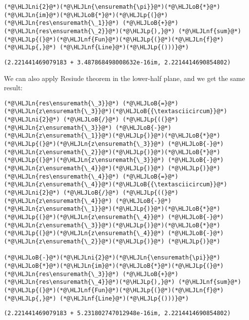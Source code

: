 \documentclass[12pt,landscape]{article}
\newcommand{\HLJLn}[1]{#1}
\newcommand{\HLJLnf}[1]{\textcolor[RGB]{66,102,213}{#1}}
\newcommand{\HLJLni}[1]{\textcolor[RGB]{59,151,46}{#1}}
\newcommand{\HLJLoB}[1]{\textcolor[RGB]{102,102,102}{\textbf{#1}}}
\newcommand{\HLJLp}[1]{#1}
\begin{document}
{\begin{lstlisting}
(*@\HLJLni{2}@*)(*@\HLJLn{\ensuremath{\pi}}@*)(*@\HLJLoB{*}@*)(*@\HLJLn{im}@*)(*@\HLJLoB{*}@*)(*@\HLJLp{(}@*)(*@\HLJLn{res\ensuremath{\_1}}@*) (*@\HLJLoB{+}@*) (*@\HLJLn{res\ensuremath{\_2}}@*)(*@\HLJLp{),}@*) (*@\HLJLnf{sum}@*)(*@\HLJLp{(}@*)(*@\HLJLnf{Fun}@*)(*@\HLJLp{(}@*)(*@\HLJLn{f}@*)(*@\HLJLp{,}@*) (*@\HLJLnf{Line}@*)(*@\HLJLp{()))}@*)
\end{lstlisting}

\begin{lstlisting}
(2.221441469079183 + 3.487868498008632e-16im, 2.2214414690854802)
\end{lstlisting}


We can also apply Resiude theorem in the lower-half plane, and we get the same result:


\begin{lstlisting}
(*@\HLJLn{res\ensuremath{\_3}}@*) (*@\HLJLoB{=}@*) (*@\HLJLn{z\ensuremath{\_3}}@*)(*@\HLJLoB{{\textasciicircum}}@*)(*@\HLJLni{2}@*) (*@\HLJLoB{/}@*) (*@\HLJLp{((}@*)(*@\HLJLn{z\ensuremath{\_3}}@*) (*@\HLJLoB{-}@*) (*@\HLJLn{z\ensuremath{\_1}}@*)(*@\HLJLp{)}@*)(*@\HLJLoB{*}@*)(*@\HLJLp{(}@*)(*@\HLJLn{z\ensuremath{\_3}}@*) (*@\HLJLoB{-}@*) (*@\HLJLn{z\ensuremath{\_2}}@*)(*@\HLJLp{)}@*)(*@\HLJLoB{*}@*)(*@\HLJLp{(}@*)(*@\HLJLn{z\ensuremath{\_3}}@*) (*@\HLJLoB{-}@*) (*@\HLJLn{z\ensuremath{\_4}}@*)(*@\HLJLp{)}@*) (*@\HLJLp{)}@*)
(*@\HLJLn{res\ensuremath{\_4}}@*) (*@\HLJLoB{=}@*) (*@\HLJLn{z\ensuremath{\_4}}@*)(*@\HLJLoB{{\textasciicircum}}@*)(*@\HLJLni{2}@*) (*@\HLJLoB{/}@*) (*@\HLJLp{((}@*)(*@\HLJLn{z\ensuremath{\_4}}@*) (*@\HLJLoB{-}@*) (*@\HLJLn{z\ensuremath{\_1}}@*)(*@\HLJLp{)}@*)(*@\HLJLoB{*}@*)(*@\HLJLp{(}@*)(*@\HLJLn{z\ensuremath{\_4}}@*) (*@\HLJLoB{-}@*) (*@\HLJLn{z\ensuremath{\_3}}@*)(*@\HLJLp{)}@*)(*@\HLJLoB{*}@*)(*@\HLJLp{(}@*)(*@\HLJLn{z\ensuremath{\_4}}@*) (*@\HLJLoB{-}@*) (*@\HLJLn{z\ensuremath{\_2}}@*)(*@\HLJLp{)}@*) (*@\HLJLp{)}@*)

(*@\HLJLoB{-}@*)(*@\HLJLni{2}@*)(*@\HLJLn{\ensuremath{\pi}}@*)(*@\HLJLoB{*}@*)(*@\HLJLn{im}@*)(*@\HLJLoB{*}@*)(*@\HLJLp{(}@*)(*@\HLJLn{res\ensuremath{\_3}}@*) (*@\HLJLoB{+}@*) (*@\HLJLn{res\ensuremath{\_4}}@*)(*@\HLJLp{),}@*) (*@\HLJLnf{sum}@*)(*@\HLJLp{(}@*)(*@\HLJLnf{Fun}@*)(*@\HLJLp{(}@*)(*@\HLJLn{f}@*)(*@\HLJLp{,}@*) (*@\HLJLnf{Line}@*)(*@\HLJLp{()))}@*)
\end{lstlisting}

\begin{lstlisting}
(2.221441469079183 + 5.231802747012948e-16im, 2.2214414690854802)
\end{lstlisting}

}
\end{document}
